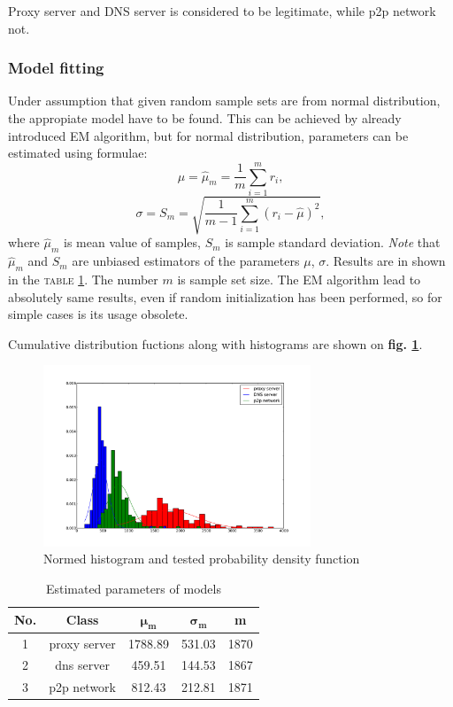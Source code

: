 \documentclass[a4paper,journal]{IEEEtran}
\begin{document}
Proxy server and DNS server is considered to be legitimate, while p2p network not.

\subsubsection{Model fitting}
Under assumption that given random sample sets are from normal distribution,
the appropiate model have to be found. 
This can be achieved by already introduced EM algorithm, but for normal distribution, 
parameters can be estimated using formulae:
\begin{equation}
\mu = \hat\mu_m = \frac{1}{m}\sum^m_{i=1}r_{i},
\end{equation}
\begin{equation}
\sigma = S_m = \sqrt{\frac{1}{m-1}\sum^m_{i=1}(r_{i}-\hat\mu)^2},
\end{equation}
where $\hat\mu_m$ is mean value of samples, $ S_m$ is sample standard deviation.
\emph{Note} that $\hat\mu_m$ and  $ S_m$ are unbiased estimators of the parameters $\mu$, $\sigma$.
Results are in shown in the \textsc{table \ref{tbl:params}}. The number $m$ is sample set size.
The EM algorithm lead to absolutely same results, even if random initialization has been performed, 
so for simple cases is its usage obsolete.

Cumulative distribution fuctions along with histograms are shown on \textbf{fig. \ref{fig:hist}}.

\begin{figure}[t]%
  \centering
  \includegraphics[width=80mm]{hist_gauspdf_dst}
  \caption{Normed histogram and tested probability density function}
  \label{fig:hist}
\end{figure}

\begin{table}[!h]
\caption{Estimated parameters of models}
\begin{center}
\begin{tabular}{|c|c|c|c|c|}\hline
\textbf{No.} & \textbf{Class}  & $\mathbf{\mu_m}$ & $\mathbf{\sigma_m}$ & \textbf{m} \\ \hline
1 & proxy server & 1788.89 & 531.03 & 1870 \\ \hline
2 & dns server & 459.51 & 144.53 & 1867 \\ \hline
3 & p2p network & 812.43 & 212.81  & 1871 \\ \hline
\end{tabular}
\end{center}
\label{tbl:params}
\end{table}
\end{document}
